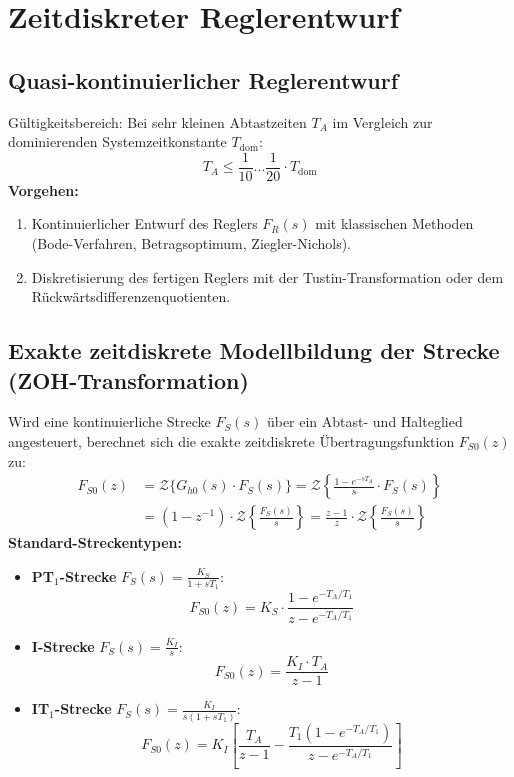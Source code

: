 \section{Zeitdiskreter Reglerentwurf}

\subsection{Quasi-kontinuierlicher Reglerentwurf}
\begin{tcolorbox}
Gültigkeitsbereich: Bei sehr kleinen Abtastzeiten $T_A$ im Vergleich zur dominierenden Systemzeitkonstante $T_{\text{dom}}$:
\[
T_A \le \frac{1}{10} \dots \frac{1}{20} \cdot T_{\text{dom}}
\]
\textbf{Vorgehen:}
\begin{enumerate}
  \item Kontinuierlicher Entwurf des Reglers $F_R(s)$ mit klassischen Methoden (Bode-Verfahren, Betragsoptimum, Ziegler-Nichols).
  \item Diskretisierung des fertigen Reglers mit der Tustin-Transformation oder dem Rückwärtsdifferenzenquotienten.
\end{enumerate}
\end{tcolorbox}

\subsection{Exakte zeitdiskrete Modellbildung der Strecke (ZOH-Transformation)}
\begin{tcolorbox}
Wird eine kontinuierliche Strecke $F_S(s)$ über ein Abtast- und Halteglied angesteuert, berechnet sich die exakte zeitdiskrete Übertragungsfunktion $F_{S0}(z)$ zu:
\begin{align*}
F_{S0}(z) &= \mathcal{Z}\{ G_{h0}(s) \cdot F_S(s) \} = \mathcal{Z}\left\{ \frac{1 - e^{-s T_A}}{s} \cdot F_S(s) \right\} \\
&= (1 - z^{-1}) \cdot \mathcal{Z}\left\{ \frac{F_S(s)}{s} \right\} = \frac{z - 1}{z} \cdot \mathcal{Z}\left\{ \frac{F_S(s)}{s} \right\}
\end{align*}
\textbf{Standard-Streckentypen:}
\begin{itemize}
  \item \textbf{PT$_1$-Strecke} $F_S(s) = \frac{K_S}{1 + s T_1}$:
  \[
  F_{S0}(z) = K_S \cdot \frac{1 - e^{-T_A/T_1}}{z - e^{-T_A/T_1}}
  \]
  \item \textbf{I-Strecke} $F_S(s) = \frac{K_I}{s}$:
  \[
  F_{S0}(z) = \frac{K_I \cdot T_A}{z - 1}
  \]
  \item \textbf{IT$_1$-Strecke} $F_S(s) = \frac{K_I}{s (1 + s T_1)}$:
  \[
  F_{S0}(z) = K_I \left[ \frac{T_A}{z - 1} - \frac{T_1 (1 - e^{-T_A/T_1})}{z - e^{-T_A/T_1}} \right]
  \]
\end{itemize}
\end{tcolorbox}

